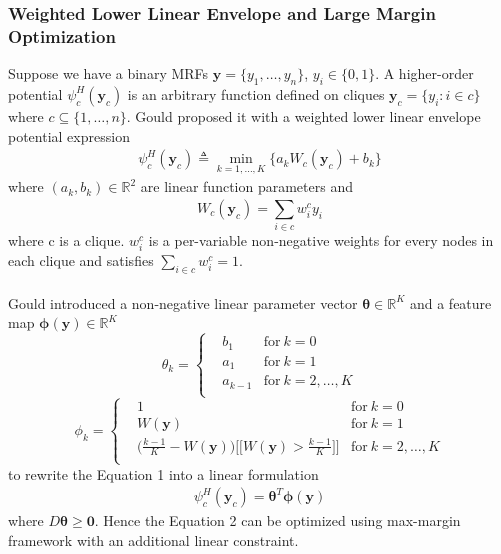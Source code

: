 \documentclass{article}
\begin{document}
	\subsubsection{Weighted Lower Linear Envelope and Large Margin Optimization}
	Suppose we have a binary MRFs $\mathbf{y}=\{y_1,\dots,y_n\}$, $y_i\in\{0,1\}$. A higher-order potential $\psi_c^H(\mathbf{y}_c)$ is an arbitrary function defined on cliques $\mathbf{y}_c=\{y_i : i\in c\}$ where $c\subseteq\{1,\dots,n\}$. Gould\cite{gouldlearning} proposed it with a weighted lower linear envelope potential expression
	\begin{align}
		\psi_c^H(\mathbf{y}_c) \triangleq \min_{k=1,\dots,K}\bigg\{a_kW_c(\mathbf{y}_c)+b_k\bigg\}
	\end{align}
	where $(a_k,b_k)\in\mathbb{R}^2$ are linear function parameters and
	$$
	W_c(\mathbf{y}_c) = \sum_{i\in c}^{}w_i^cy_i
	$$
	where c is a clique. $w_i^c$ is a per-variable non-negative weights for every nodes in each clique and satisfies $\sum_ {i\in c}^{}w_i^c=1$.\\\\
	Gould\cite{gouldlearning} introduced a non-negative linear parameter vector $\boldsymbol{\theta}\in\mathbb{R}^K$ and a feature map $\boldsymbol{\phi}(\mathbf{y})\in \mathbb{R}^K$ 
	\begin{equation*}
		\theta_k = \left\{
		\begin{aligned}
		& b_1	& \text{for} \ k=0\\
		& a_1 & \text{for}\ k=1\\
		& a_{k-1}  & \text{for} \ k=2,\dots,K\\
		\end{aligned}
		\right.
	\end{equation*}
	\begin{equation*}
		\phi_k = \left\{
		\begin{aligned}
		& 1	& \text{for} \ k=0\\
		& W(\mathbf{y}) & \text{for}\ k=1\\
		& \bigg(\frac{k-1}{K}-W(\mathbf{y}) \bigg)\bigg[\bigg[ W(\mathbf{y}) > \frac{k-1}{K}\bigg]\bigg]  & \text{for} \ k=2,\dots,K\\
		\end{aligned}
		\right.
	\end{equation*}
	to rewrite the Equation 1 into a linear formulation
	\begin{align}
		\psi_c^H(\mathbf{y}_c)=\boldsymbol{\theta}^T\boldsymbol{\phi}(\mathbf{y})
	\end{align}
	where $ D\boldsymbol{\theta}\geq \mathbf{0}$. Hence the Equation 2 can be optimized using max-margin framework with an additional linear constraint.
	
\end{document}
